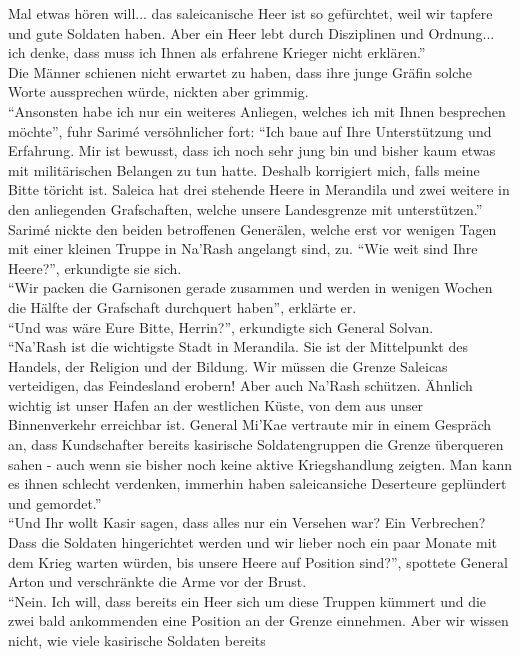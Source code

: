 Mal etwas hören will... das saleicanische Heer ist so gefürchtet, weil wir tapfere und gute 
Soldaten haben. Aber ein Heer lebt durch Disziplinen und Ordnung... ich denke, dass muss ich Ihnen 
als erfahrene Krieger nicht erklären.''\\
Die Männer schienen nicht erwartet zu haben, dass ihre junge Gräfin solche Worte aussprechen würde, 
nickten aber grimmig.\\
``Ansonsten habe ich nur ein weiteres Anliegen, welches ich mit Ihnen besprechen möchte'', fuhr 
Sarimé versöhnlicher fort: ``Ich baue auf Ihre Unterstützung und Erfahrung. Mir ist bewusst, dass 
ich noch sehr jung bin und bisher kaum etwas mit militärischen Belangen zu tun hatte. Deshalb 
korrigiert mich, falls meine Bitte töricht ist. Saleica hat drei stehende Heere in Merandila und 
zwei weitere in den anliegenden Grafschaften, welche unsere Landesgrenze mit unterstützen.''\\
Sarimé nickte den beiden betroffenen Generälen, welche erst vor wenigen Tagen mit einer kleinen 
Truppe in Na'Rash angelangt sind, zu. ``Wie weit sind Ihre Heere?'', erkundigte sie sich.\\
``Wir packen die Garnisonen gerade zusammen und werden in wenigen Wochen die Hälfte der Grafschaft 
durchquert haben'', erklärte er.\\
``Und was wäre Eure Bitte, Herrin?'', erkundigte sich General Solvan.\\
``Na'Rash ist die wichtigste Stadt in Merandila. Sie ist der Mittelpunkt des Handels, der Religion 
und der Bildung. Wir müssen die Grenze Saleicas verteidigen, das Feindesland erobern! Aber auch 
Na'Rash schützen. Ähnlich wichtig ist unser Hafen an der westlichen Küste, von dem aus unser 
Binnenverkehr erreichbar ist. General Mi'Kae vertraute mir in einem Gespräch an, dass Kundschafter 
bereits kasirische Soldatengruppen die Grenze überqueren sahen - auch wenn sie bisher noch keine 
aktive Kriegshandlung zeigten. Man kann es ihnen schlecht verdenken, immerhin haben saleicansiche 
Deserteure geplündert und gemordet.''\\
``Und Ihr wollt Kasir sagen, dass alles nur ein Versehen war? Ein Verbrechen? Dass die Soldaten 
hingerichtet werden und wir lieber noch ein paar Monate mit dem Krieg warten würden, bis unsere 
Heere auf Position sind?'', spottete General Arton und verschränkte die Arme vor der Brust.\\
``Nein. Ich will, dass bereits ein Heer sich um diese Truppen kümmert und die zwei bald ankommenden 
eine Position an der Grenze einnehmen. Aber wir wissen nicht, wie viele kasirische Soldaten bereits 

